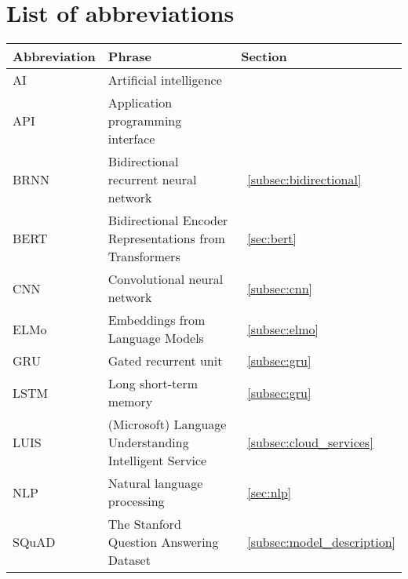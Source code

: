 \chapter*{List of abbreviations}
\label{ch:abbrevations}

\begin{tabular}{l l l}
    \textbf{Abbreviation} & \textbf{Phrase} & \textbf{Section} \\
    \hline
    AI & Artificial intelligence \\
    API & Application programming interface\\
    BRNN & Bidirectional recurrent neural network &~\ref{subsec:bidirectional}\\
    BERT & Bidirectional Encoder Representations from Transformers &~\ref{sec:bert}\\
    CNN & Convolutional neural network &~\ref{subsec:cnn}\\
    ELMo & Embeddings from Language Models &~\ref{subsec:elmo}\\
    GRU & Gated recurrent unit &~\ref{subsec:gru}\\
    LSTM & Long short-term memory &~\ref{subsec:gru}\\
    LUIS & (Microsoft) Language Understanding Intelligent Service &~\ref{subsec:cloud_services}\\
    NLP & Natural language processing &~\ref{sec:nlp}\\
    SQuAD & The Stanford Question Answering Dataset &~\ref{subsec:model_description}\\
\end{tabular}